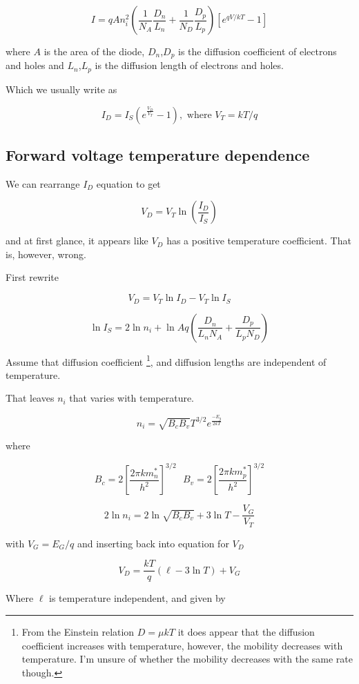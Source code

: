 \[
I = q A n_i^2 \left( \frac{1}{N_A}\frac{D_n}{L_n} + \frac{1}{N_D}\frac{D_p}{L_p}
\right)\left[ e^{qV/kT} - 1 \right]
\]

where \(A\) is the area of the diode, \(D_n\),\(D_p\) is the diffusion
coefficient of electrons and holes and \(L_n\),\(L_p\) is the diffusion
length of electrons and holes.

Which we usually write as

\[ I_D = I_S(e^{\frac{V_D}{V_T}} - 1 ),\text{ where } V_T = kT/q \]

\subsection{Forward voltage temperature
dependence}\label{forward-voltage-temperature-dependence}

We can rearrange \(I_D\) equation to get

\[ V_D = V_T \ln\left(\frac{I_D}{I_S}\right) \]

and at first glance, it appears like \(V_D\) has a positive temperature
coefficient. That is, however, wrong.

First rewrite

\[ V_D = V_T \ln{I_D} - V_T \ln{I_S} \]

\[ \ln{I_S} =  2 \ln{n_i} +  \ln{Aq\left (\frac{D_n}{L_n N_A} +
\frac{D_p}{L_p N_D}\right)} \]

Assume that diffusion coefficient \footnote{From the Einstein relation
  \(D = \mu k T\) it does appear that the diffusion coefficient
  increases with temperature, however, the mobility decreases with
  temperature. I'm unsure of whether the mobility decreases with the
  same rate though.}, and diffusion lengths are independent of
temperature.

That leaves \(n_i\) that varies with temperature.

\[ n_i = \sqrt{B_c B_v} T^{3/2} e^\frac{-E_g}{2 kT} \]

where

\[ B_c = 2 \left[\frac{2 \pi  k m_n^*}{h^2}\right]^{3/2} \text{  } B_v = 2 \left[\frac{2 \pi  k m_p^*}{h^2}\right]^{3/2} \]

\[ 2 \ln{n_i} = 2\ln{\sqrt{B_c B_v}}  + 3 \ln T -
\frac{V_G}{V_T}\]

with \(V_G = E_G/q\) and inserting back into equation for \(V_D\)

\[ V_D = \frac{kT}{q}(\ell  - 3 \ln T) + V_G \]

Where \(\ell\) is temperature independent, and given by

